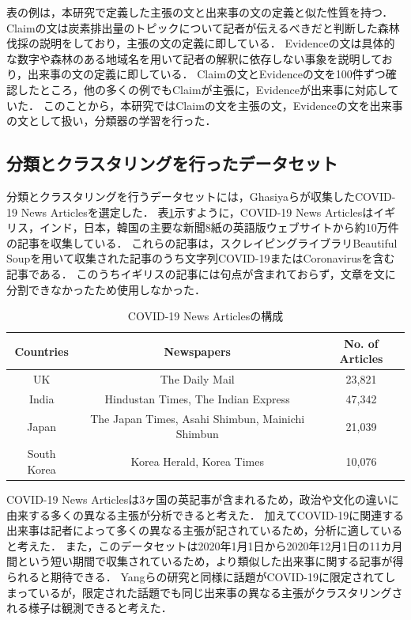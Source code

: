 \documentclass[12pt,a4j]{jreport}
\begin{document}
表の例は，本研究で定義した主張の文と出来事の文の定義と似た性質を持つ．
Claimの文は炭素排出量のトピックについて記者が伝えるべきだと判断した森林伐採の説明をしており，主張の文の定義に即している．
Evidenceの文は具体的な数字や森林のある地域名を用いて記者の解釈に依存しない事象を説明しており，出来事の文の定義に即している．
Claimの文とEvidenceの文を100件ずつ確認したところ，他の多くの例でもClaimが主張に，Evidenceが出来事に対応していた．
このことから，本研究ではClaimの文を主張の文，Evidenceの文を出来事の文として扱い，分類器の学習を行った．


\subsection{分類とクラスタリングを行ったデータセット}
分類とクラスタリングを行うデータセットには，Ghasiyaらが収集したCOVID-19 News Articlesを選定した\cite{ghasiya_investigating_2021}．
表\ref{covid_19_news_articles_composition}示すように，COVID-19 News Articlesはイギリス，インド，日本，韓国の主要な新聞8紙の英語版ウェブサイトから約10万件の記事を収集している．
これらの記事は，スクレイピングライブラリBeautiful Soupを用いて収集された記事のうち文字列COVID-19またはCoronavirusを含む記事である．
このうちイギリスの記事には句点が含まれておらず，文章を文に分割できなかったため使用しなかった．

\begin{table}[H]
  \caption{COVID-19 News Articlesの構成}
  \centering
  \vspace{4mm}
  \begin{tabular}{ccc}
    \hline
    Countries & Newspapers & No. of Articles \\
    \hline
    UK & The Daily Mail & 23,821 \\
    India & Hindustan Times, The Indian Express & 47,342 \\
    Japan & The Japan Times, Asahi Shimbun, Mainichi Shimbun & 21,039 \\
    South Korea & Korea Herald, Korea Times & 10,076 \\
    \hline
    \end{tabular}
  \label{covid_19_news_articles_composition}
\end{table}

COVID-19 News Articlesは3ヶ国の英記事が含まれるため，政治や文化の違いに由来する多くの異なる主張が分析できると考えた．
加えてCOVID-19に関連する出来事は記者によって多くの異なる主張が記されているため，分析に適していると考えた．
また，このデータセットは2020年1月1日から2020年12月1日の11カ月間という短い期間で収集されているため，より類似した出来事に関する記事が得られると期待できる．
Yangらの研究と同様に話題がCOVID-19に限定されてしまっているが，限定された話題でも同じ出来事の異なる主張がクラスタリングされる様子は観測できると考えた．
\end{document}
